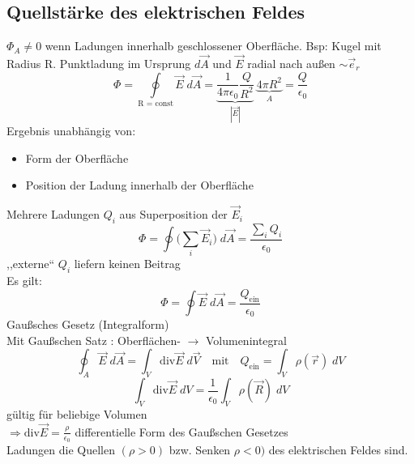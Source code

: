 \documentclass[titlepage,12pt,a4paper,ngerman]{report}
\newcommand{\tx}[1]{\textrm{#1}}
\begin{document}
\subsection{Quellstärke des elektrischen Feldes}
$\Phi_A \neq 0$ wenn Ladungen innerhalb geschlossener Oberfläche. Bsp: Kugel mit Radius R. Punktladung im Ursprung $d\vec{A}$ und $\vec{E}$ radial nach außen $\sim \vec{e}_r$ 
$$\Phi = \oint\limits_{\textrm{R = const}} \vec{E}\; d \vec{A} = \underbrace{\frac{1}{4\pi\epsilon_0} \frac{Q}{R^2}}_{|\vec{E}|}\  \underbrace{4\pi R^2}_{A} = \frac{Q}{\epsilon_0}$$
Ergebnis unabhängig von:
\begin{itemize}
\item Form der Oberfläche
\item Position der Ladung innerhalb der Oberfläche
\end{itemize} 
Mehrere Ladungen $Q_i$ aus Superposition der $\vec{E}_i$ 
$$\Phi = \oint \Big(\sum_i \vec{E}_i\Big) \;d \vec{A} = \frac{\sum_i Q_i}{\epsilon_0}$$
,,externe`` $Q_i$ liefern keinen Beitrag\\
Es gilt:
$$\boxed{\Phi = \oint \vec{E}\; d\vec{A} = \frac{Q_{\tx{ein}}}{\epsilon_0}} $$
Gaußsches Gesetz (Integralform)\\
Mit Gaußschen Satz : Oberflächen- $\rightarrow$ Volumenintegral\\
$$ \oint_A \vec{E} \;d \vec{A} = \int_V \textrm{div} \vec{E} \; d \vec{V} \quad \textrm{mit} \quad Q_{\tx{ein}} = \int_V \rho(\vec{r})\;dV$$
$$\int_V \textrm{div} \vec{E}\; dV = \frac{1}{\epsilon_0} \int_V \rho(\vec{R}) \; dV$$
gültig für beliebige Volumen\\
$\Rightarrow \textrm{div} \vec{E}=\frac{\rho}{\epsilon_0}$ differentielle Form des Gaußschen Gesetzes\\
Ladungen die Quellen $(\rho > 0 )$ bzw. Senken $\rho < 0)$ des elektrischen Feldes sind.
\end{document}
